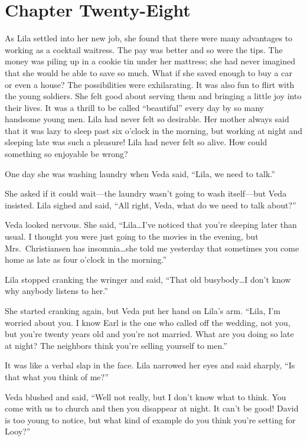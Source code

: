 \documentclass[
  american,
  letterpaper,
]{book}
\begin{document}

\chapter{Chapter Twenty-Eight}\label{chapter-twenty-eight}

As Lila settled into her new job, she found that there were many
advantages to working as a cocktail waitress. The pay was better and so
were the tips. The money was piling up in a cookie tin under her
mattress; she had never imagined that she would be able to save so much.
What if she saved enough to buy a car or even a house? The possibilities
were exhilarating. It was also fun to flirt with the young soldiers. She
felt good about serving them and bringing a little joy into their lives.
It was a thrill to be called ``beautiful'' every day by so many handsome
young men. Lila had never felt so desirable. Her mother always said that
it was lazy to sleep past six o'clock in the morning, but working at
night and sleeping late was such a pleasure! Lila had never felt so
alive. How could something so enjoyable be wrong?

One day she was washing laundry when Veda said, ``Lila, we need to
talk.''

She asked if it could wait---the laundry wasn't going to wash
itself---but Veda insisted. Lila sighed and said, ``All right, Veda,
what do we need to talk about?''

Veda looked nervous. She said, ``Lila\ldots I've noticed that you're
sleeping later than usual. I thought you were just going to the movies
in the evening, but Mrs.~Christiansen has insomnia\ldots she told me
yesterday that sometimes you come home as late as four o'clock in the
morning.''

Lila stopped cranking the wringer and said, ``That old busybody\ldots I
don't know why anybody listens to her.''

She started cranking again, but Veda put her hand on Lila's arm. ``Lila,
I'm worried about you. I know Earl is the one who called off the
wedding, not you, but you're twenty years old and you're not married.
What are you doing so late at night? The neighbors think you're selling
yourself to men.''

It was like a verbal slap in the face. Lila narrowed her eyes and said
sharply, ``Is that what you think of me?''

Veda blushed and said, ``Well not really, but I don't know what to
think. You come with us to church and then you disappear at night. It
can't be good! David is too young to notice, but what kind of example do
you think you're setting for Looy?''
\end{document}

